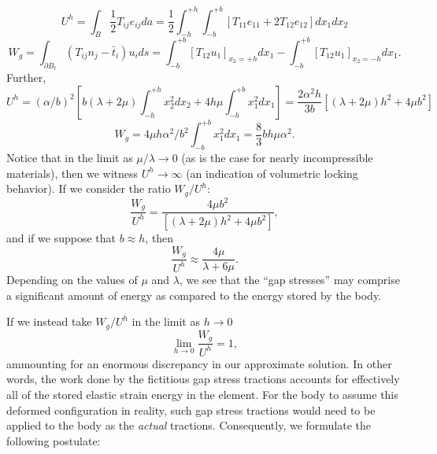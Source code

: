 \documentclass[11pt]{article} %
\begin{document}
\begin{equation}
	U^h = \int_B \frac{1}{2} T_{ij} e_{ij} da = \frac{1}{2} \int_{-h}^{+h} \int_{-b}^{+b} \left[ T_{11} e_{11} + 2 T_{12} e_{12} \right] dx_1 dx_2
\end{equation}
\begin{equation}
	W_g = \int_{\partial B_t} (T_{ij} n_j - \bar{t}_i) u_i ds = \int_{-b}^{+b}\left[ T_{12} u_1 \right]_{x_2 = +h} dx_1 - \int_{-b}^{+b} \left[ T_{12} u_1 \right]_{x_2 = -h} dx_1.
\end{equation}
Further,
\begin{equation}
	U^h = (\alpha / b)^2 \left[ b (\lambda + 2 \mu) \int_{-h}^{+h} x_2^2 dx_2 + 4 h \mu \int_{-b}^{+b} x_1^2 dx_1 \right] = \frac{2 \alpha^2 h}{3 b} \left[ (\lambda + 2 \mu) h^2 + 4 \mu b^2 \right]
\end{equation}
\begin{equation}
	W_g = 4 \mu h \alpha^2 / b^2 \int_{-b}^{+b} x_1^2 dx_1 = \frac{8}{3} b h \mu \alpha^2.
\end{equation}
Notice that in the limit as $\mu / \lambda \rightarrow 0$ (as is the case for nearly incompressible materials), then we witness $U^h \rightarrow \infty$ (an indication of volumetric locking behavior). If we consider the ratio $W_g / U^h$:
\begin{equation}
	\frac{W_g}{U^h} = \frac{4 \mu b^2}{\left[ (\lambda + 2 \mu) h^2 + 4 \mu b^2 \right]},
\end{equation}
and if we suppose that $b \approx h$, then
\begin{equation}
	\frac{W_g}{U^h} \approx \frac{4 \mu}{\lambda + 6 \mu}.
\end{equation}
Depending on the values of $\mu$ and $\lambda$, we see that the ``gap stresses'' may comprise a significant amount of energy as compared to the energy stored by the body.

If we instead take $W_g / U^h$ in the limit as $h \rightarrow 0$
\begin{equation}
	\lim_{h \rightarrow 0} \frac{W_g}{U^h} = 1,
\end{equation}
ammounting for an enormous discrepancy in our approximate solution. In other words, the work done by the fictitious gap stress tractions accounts for effectively all of the stored elastic strain energy in the element. For the body to assume this deformed configuration in reality, such gap stress tractions would need to be applied to the body as the \textit{actual} tractions. Consequently, we formulate the following postulate:
\end{document}
